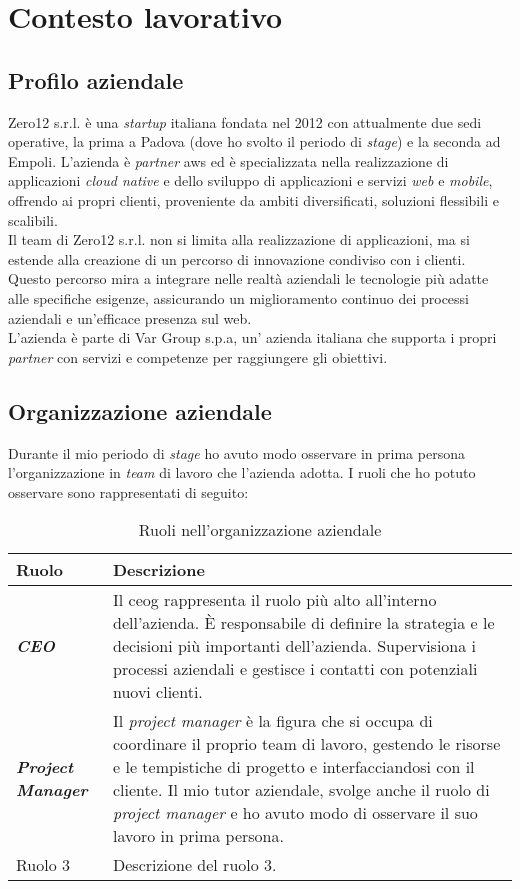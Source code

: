 
\chapter{Contesto lavorativo}
\label{cap:introduzione}
\section{Profilo aziendale}
Zero12 s.r.l. è una \textit{startup} italiana fondata nel 2012 con attualmente due sedi operative, la prima a Padova (dove ho svolto il periodo di \textit{stage}) e la seconda ad Empoli. 
L'azienda è \textit{partner} \gls{aws} ed è specializzata nella realizzazione di applicazioni \textit{cloud native} e dello sviluppo di applicazioni e servizi \textit{web} e \textit{mobile}, offrendo ai propri clienti, proveniente da ambiti diversificati, soluzioni flessibili e scalibili.\\
Il team di Zero12 s.r.l. non si limita alla realizzazione di applicazioni, ma si estende alla creazione di un percorso di innovazione condiviso con i clienti. Questo percorso mira a integrare nelle realtà aziendali le tecnologie più adatte alle specifiche esigenze, assicurando un miglioramento continuo dei processi aziendali e un’efficace presenza sul web.\\
L'azienda è parte di Var Group s.p.a, un' azienda italiana che supporta i propri \textit{partner} con servizi e competenze per raggiungere gli obiettivi.
\section{Organizzazione aziendale}
Durante il mio periodo di \textit{stage} ho avuto modo osservare in prima persona l'organizzazione in \textit{team} di lavoro che l'azienda adotta.
I ruoli che ho potuto osservare sono rappresentati di seguito:
\begin{table}[ht]
    \centering
    \begin{tabular}{|>{\raggedright\arraybackslash}p{3cm}|>{\raggedright\arraybackslash}p{8.5cm}|}
    \hline
    \textbf{Ruolo} & \textbf{Descrizione} \\
    \hline
    \textbf{\textit{CEO}} & Il \gls{ceog} rappresenta il ruolo più alto all'interno dell'azienda. È responsabile di definire la strategia e le decisioni più importanti dell'azienda. Supervisiona i processi aziendali e gestisce i contatti con potenziali nuovi clienti. \\
    \hline
    \textbf{\textit{Project Manager}} & Il \textit{project manager} è la figura che si occupa di coordinare il proprio team di lavoro, gestendo le risorse e le tempistiche di progetto e interfacciandosi con il cliente. Il mio tutor aziendale, svolge anche il ruolo di \textit{project manager} e ho avuto modo di osservare il suo lavoro in prima persona.\\
    \hline
    Ruolo 3 & Descrizione del ruolo 3. \\
    \hline
    \end{tabular}
    \caption{Ruoli nell'organizzazione aziendale}
    \label{tab:organizzazione}
\end{table}

